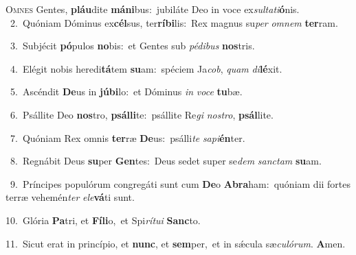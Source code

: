 \lettrine{\initial\textcolor{\initialcolor}{O}}{mnes} Gentes, \textbf{pláu}\-dite \textbf{má}\-\textbf{ni}bus:~\star jubiláte Deo in voce ex\-\textit{sul}\-\textit{ta}\textit{ti}\textbf{ó}nis.\\
{\numbfont\textcolor{\numbcolor}{~2.}}~Quóniam Dóminus ex\-\textbf{cél}\-sus, ter\-\textbf{rí}\-\textbf{bi}lis:~\star Rex magnus su\textit{per} \textit{om}\-\textit{nem} \textbf{ter}\-ram.\par
{\numbfont\textcolor{\numbcolor}{~3.}}~Subjécit \textbf{pó}\-pulos \textbf{no}\-bis:~\star et Gentes sub \textit{pé}\-\textit{di}\textit{bus} \textbf{nos}\-tris.\par
{\numbfont\textcolor{\numbcolor}{~4.}}~Elégit nobis heredi\-\textbf{tá}\-tem \textbf{su}\-am:~\star spéciem Ja\-\textit{cob}\-, \textit{quam} \textit{di}\-\textbf{lé}xit.\par
{\numbfont\textcolor{\numbcolor}{~5.}}~Ascéndit \textbf{De}\-us in \textbf{jú}\-\textbf{bi}lo:~\star et Dóminus \textit{in} \textit{vo}\-\textit{ce} \textbf{tu}\-bæ.\par
{\numbfont\textcolor{\numbcolor}{~6.}}~Psállite Deo \textbf{nos}\-tro, \textbf{psál}\-\textbf{li}te:~\star psállite Re\textit{gi} \textit{nos}\-\textit{tro}, \textbf{psál}\-lite.\par
{\numbfont\textcolor{\numbcolor}{~7.}}~Quóniam Rex omnis \textbf{ter}\-ræ \textbf{De}\-us:~\star psálli\textit{te} \textit{sa}\-\textit{pi}\textbf{én}ter.\par
{\numbfont\textcolor{\numbcolor}{~8.}}~Regnábit Deus \textbf{su}\-per \textbf{Gen}\-tes:~\star Deus sedet super se\textit{dem} \textit{sanc}\-\textit{tam} \textbf{su}\-am.\par
{\numbfont\textcolor{\numbcolor}{~9.}}~Príncipes populórum congregáti sunt cum \textbf{De}\-o \textbf{A}\-\textbf{bra}ham:~\star quóniam dii fortes terræ vehemén\textit{ter} \textit{e}\-\textit{le}\textbf{vá}ti sunt.\par
{\numbfont\textcolor{\numbcolor}{10.}}~Glória \textbf{Pa}\-tri, et \textbf{Fí}\-\textbf{li}o,~\star et Spi\-\textit{rí}\-\textit{tu}\textit{i} \textbf{Sanc}\-to.\par
{\numbfont\textcolor{\numbcolor}{11.}}~Sicut erat in princípio, et \textbf{nunc}\-, et \textbf{sem}\-per,~\star et in sǽcula sæ\-\textit{cu}\-\textit{ló}\textit{rum}. \textbf{A}\-men.\par
